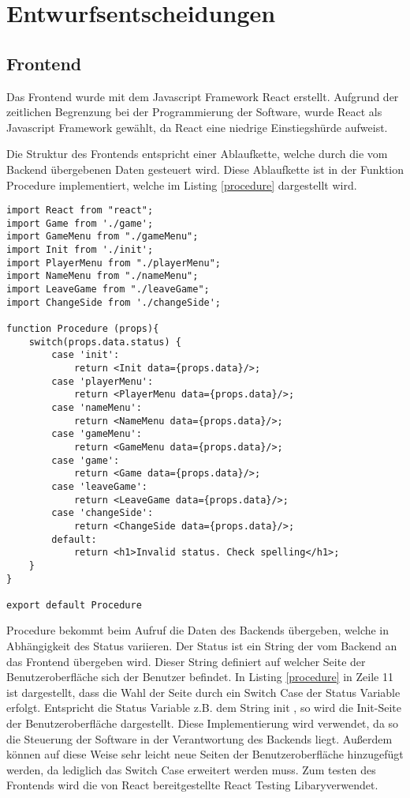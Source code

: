 \chapter{Entwurfsentscheidungen}
\section{Frontend}
Das Frontend wurde mit dem Javascript Framework React erstellt. Aufgrund der zeitlichen Begrenzung bei der Programmierung der Software, wurde React als Javascript Framework gewählt, da React eine niedrige Einstiegshürde aufweist. 

Die Struktur des Frontends entspricht einer Ablaufkette, welche durch die vom Backend übergebenen Daten gesteuert wird. Diese Ablaufkette ist in der Funktion Procedure implementiert, welche im Listing \ref{procedure} dargestellt wird.

\begin{lstlisting}[caption={Procedure Funktion des Frontends},captionpos=b]
import React from "react";
import Game from './game';
import GameMenu from "./gameMenu";
import Init from './init';
import PlayerMenu from "./playerMenu";
import NameMenu from "./nameMenu";
import LeaveGame from "./leaveGame";
import ChangeSide from './changeSide';

function Procedure (props){
    switch(props.data.status) {
        case 'init':
            return <Init data={props.data}/>;
        case 'playerMenu':
            return <PlayerMenu data={props.data}/>;
        case 'nameMenu':
            return <NameMenu data={props.data}/>;
        case 'gameMenu':
            return <GameMenu data={props.data}/>;
        case 'game':
            return <Game data={props.data}/>;
        case 'leaveGame':
            return <LeaveGame data={props.data}/>;
        case 'changeSide':
            return <ChangeSide data={props.data}/>;
        default:
            return <h1>Invalid status. Check spelling</h1>;
    }
}

export default Procedure
\end{lstlisting}
\label{procedure}

Procedure bekommt beim Aufruf die Daten des Backends übergeben, welche in Abhängigkeit des Status variieren. Der Status ist ein String der vom Backend an das Frontend übergeben wird. Dieser String definiert auf welcher Seite der Benutzeroberfläche sich der Benutzer befindet. In Listing \ref{procedure} in Zeile 11 ist dargestellt, dass die Wahl der Seite durch ein Switch Case der Status Variable erfolgt. Entspricht die Status Variable z.B. dem String \glqq init\grqq{} , so wird die Init-Seite der Benutzeroberfläche dargestellt. Diese Implementierung wird verwendet, da so die Steuerung der Software in der Verantwortung des Backends liegt. Außerdem können auf diese Weise sehr leicht neue Seiten der Benutzeroberfläche hinzugefügt werden, da lediglich das Switch Case erweitert werden muss. Zum testen des Frontends wird die von React bereitgestellte \glqq React Testing Libary\grqq verwendet.

